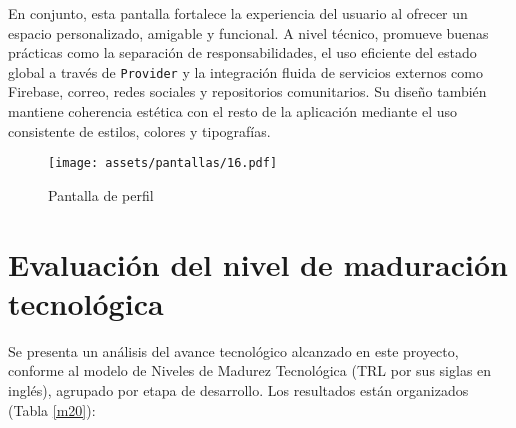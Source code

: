 En conjunto, esta pantalla fortalece la experiencia del usuario al ofrecer un espacio personalizado, amigable y funcional. A nivel técnico, promueve buenas prácticas como la separación de responsabilidades, el uso eficiente del estado global a través de \texttt{Provider} y la integración fluida de servicios externos como Firebase, correo, redes sociales y repositorios comunitarios. Su diseño también mantiene coherencia estética con el resto de la aplicación mediante el uso consistente de estilos, colores y tipografías.



\begin{figure}[h!]
\centering
  \texttt{[image: assets/pantallas/16.pdf]}
  \caption{Pantalla de perfil}
  \label{pantallas16}
\end{figure}

 
\newpage
\section{Evaluación del nivel de maduración tecnológica}
Se presenta un análisis del avance tecnológico alcanzado en este proyecto, conforme al modelo de Niveles de Madurez Tecnológica (TRL por sus siglas en inglés), agrupado por etapa de desarrollo. Los resultados están organizados (Tabla \ref{m20}):



